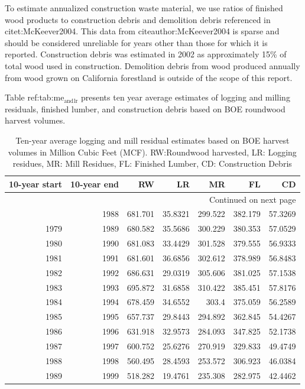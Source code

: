 \documentclass[a4paper]{article}
\begin{document}
To estimate annualized construction waste material, we use ratios of finished wood products to construction debris and demolition debris referenced in citet:McKeever2004. This data from citeauthor:McKeever2004 is sparse and should be considered unreliable for years other than those for which it is reported.  Construction debris was estimated in 2002 as approximately 15\% of total wood used in construction. Demolition debris from wood produced annually from wood grown on California forestland is outside of the scope of this report.

Table ref:tab:me$_{\text{and}}$$_{\text{lr}}$ presents ten year average estimates of logging and milling residuals, finished lumber, and construction debris based on BOE roundwood harvest volumes. 

\begin{longtable}{rrrrrrr}
\caption{Ten-year average logging and mill residual estimates based on BOE harvest volumes in Million Cubic Feet (MCF). RW:Roundwood harvested, LR: Logging residues, MR: Mill Residues, FL: Finished Lumber, CD: Construction Debris}
\\
10-year start & 10-year end & RW & LR & MR & FL & CD\\
\hline
\endhead
\hline\multicolumn{7}{r}{Continued on next page} \\
\endfoot
\endlastfoot
1978 & 1988 & 681.701 & 35.8321 & 299.522 & 382.179 & 57.3269\\
1979 & 1989 & 680.582 & 35.5686 & 300.229 & 380.353 & 57.0529\\
1980 & 1990 & 681.083 & 33.4429 & 301.528 & 379.555 & 56.9333\\
1981 & 1991 & 681.601 & 36.6856 & 302.612 & 378.989 & 56.8483\\
1982 & 1992 & 686.631 & 29.0319 & 305.606 & 381.025 & 57.1538\\
1983 & 1993 & 695.872 & 31.6858 & 310.422 & 385.451 & 57.8176\\
1984 & 1994 & 678.459 & 34.6552 & 303.4 & 375.059 & 56.2589\\
1985 & 1995 & 657.737 & 29.8443 & 294.892 & 362.845 & 54.4267\\
1986 & 1996 & 631.918 & 32.9573 & 284.093 & 347.825 & 52.1738\\
1987 & 1997 & 600.752 & 25.6276 & 270.919 & 329.833 & 49.4749\\
1988 & 1998 & 560.495 & 28.4593 & 253.572 & 306.923 & 46.0384\\
1989 & 1999 & 518.282 & 19.4761 & 235.308 & 282.975 & 42.4462\\

\end{longtable}
\end{document}
